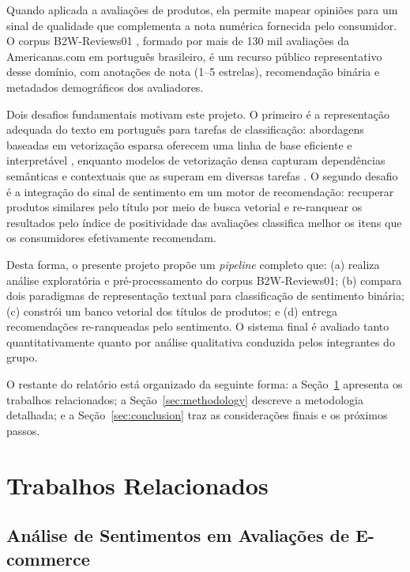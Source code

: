 \documentclass{IEEEtran}
\begin{document}
Quando aplicada a avaliações de produtos, ela permite mapear opiniões para um sinal de qualidade que complementa a nota numérica fornecida pelo consumidor. O corpus B2W-Reviews01 \cite{real2019b2w}, formado por mais de 130 mil avaliações da Americanas.com em português brasileiro, é um recurso público representativo desse domínio, com anotações de nota (1--5 estrelas), recomendação binária e metadados demográficos dos avaliadores.

Dois desafios fundamentais motivam este projeto. O primeiro é a representação adequada do texto em português para tarefas de classificação: abordagens baseadas em vetorização esparsa oferecem uma linha de base eficiente e interpretável \cite{BPLN_livro_4ed:2026}, enquanto modelos de vetorização densa capturam dependências semânticas e contextuais que as superam em diversas tarefas \cite{jm3}. O segundo desafio é a integração do sinal de sentimento em um motor de recomendação: recuperar produtos similares pelo título por meio de busca vetorial e re-ranquear os resultados pelo índice de positividade das avaliações classifica melhor os itens que os consumidores efetivamente recomendam.

Desta forma, o presente projeto propõe um \textit{pipeline} completo que: (a) realiza análise exploratória e pré-processamento do corpus B2W-Reviews01; (b) compara dois paradigmas de representação textual para classificação de sentimento binária; (c) constrói um banco vetorial dos títulos de produtos; e (d) entrega recomendações re-ranqueadas pelo sentimento. O sistema final é avaliado tanto quantitativamente quanto por análise qualitativa conduzida pelos integrantes do grupo.

O restante do relatório está organizado da seguinte forma: a Seção~\ref{sec:related} apresenta os trabalhos relacionados; a Seção~\ref{sec:methodology} descreve a metodologia detalhada; e a Seção~\ref{sec:conclusion} traz as considerações finais e os próximos passos.

\section{Trabalhos Relacionados}
\label{sec:related}

\subsection{Análise de Sentimentos em Avaliações de E-commerce}
\end{document}

